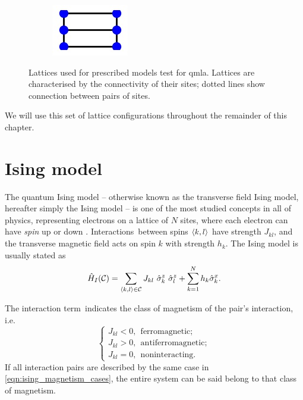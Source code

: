 \begin{figure}
\begin{center}
\begin{subfigure}{2.25cm}
            \caption{}
        \end{subfigure}
        \qquad
        \begin{subfigure}{2cm} 
            \includegraphics{theoretical_study/figures/lattices/_6_site_grid.jpg}        
            \caption{}
        \end{subfigure}
    \end{center}
    \caption[Lattices for prescribed \gls{qmla} ]{
        Lattices used for prescribed models test for \gls{qmla}.
        Lattices are characterised by the connectivity of their sites; 
            dotted lines show connection between pairs of sites.                 
    }
    \label{fig:lattices}
\end{figure}

We will use this set of lattice configurations throughout the remainder of this chapter. 

\section{Ising model}\label{sec:ising}
The quantum Ising model -- otherwise known as the transverse field Ising model, hereafter simply the Ising model -- 
    is one of the most studied concepts in all of physics, 
    representing electrons on a lattice of $N$ sites, 
    where each electron can have \emph{spin} up or down 
    \cite{ising1925beitrag, onsager1944crystal, brush1967history}.
Interactions\footnotemark \ between spins ${ \langle k, l \rangle }$ have strength $J_{kl}$, 
    and the transverse magnetic field acts on spin $k$ with strength $h_k$. 
The Ising model is usually stated as 
\begin{equation}
    \label{eqn:ising_standard_form}
    \hat{H}_I(\cc) = \sum_{\bkl \in \mathcal{C}} J_{kl}  \ \hat{\sigma}_k^z \ \hat{\sigma}_{l}^z + \sum_{k=1}^{N} h_k \hat{\sigma}_{k}^x.
\end{equation}

The interaction term\footnotemark \ indicates the class of magnetism of the pair's interaction, i.e. 
\begin{equation}
    \label{eqn:ising_magnetism_cases}
    \begin{cases}
        J_{kl} < 0, \ \ \textrm{ferromagnetic}; \\
        J_{kl} > 0, \ \ \textrm{antiferromagnetic}; \\
        J_{kl} = 0, \ \ \textrm{noninteracting}.
    \end{cases}
\end{equation}
If all interaction pairs are described by the same case in \cref{eqn:ising_magnetism_cases}, 
    the entire system can be said belong to that class of magnetism. 

